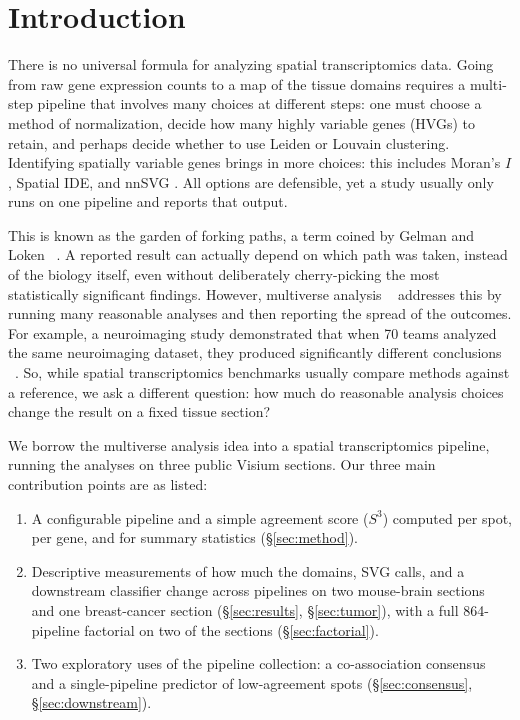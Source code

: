 \section{Introduction}
\label{sec:intro}

There is no universal formula for analyzing spatial transcriptomics data. Going from raw gene expression counts to a map of the tissue domains requires a multi-step pipeline that involves many choices at different steps: one must choose a method of normalization, decide how many highly variable genes (HVGs) to retain, and perhaps decide whether to use Leiden \cite{traag2019louvain} or Louvain \cite{blondel2008fast} clustering. Identifying spatially variable genes brings in more choices: this includes Moran's $I$, Spatial IDE, and nnSVG \cite{moran1950notes, svensson2018spatialde, weber2023nnsvg}. All options are defensible, yet a study usually only runs on one pipeline and reports that output. 

This is known as the garden of forking paths, a term coined by Gelman and Loken ~\cite{gelman2013garden}. A reported result can actually depend on which path was taken, instead of the biology itself, even without deliberately cherry-picking the most statistically significant findings. However, multiverse analysis ~\cite{steegen2016increasing} addresses
this by running many reasonable analyses and then reporting the spread of the outcomes. For example, a neuroimaging study demonstrated that when 70 teams analyzed the same neuroimaging dataset, they produced significantly different conclusions ~\cite{botvinik2020variability}. So, while spatial transcriptomics benchmarks usually compare methods against a reference, we ask a different question: how much do reasonable analysis choices change the result on a fixed tissue section? 

We borrow the multiverse analysis idea into a spatial transcriptomics pipeline, running the analyses on three public Visium sections. Our three main contribution points are as listed:

\begin{enumerate}
\item[\textbf{C1}] A configurable pipeline and a simple agreement score
  ($S^3$) computed per spot, per gene, and for summary statistics
  (\S\ref{sec:method}).
\item[\textbf{C2}] Descriptive measurements of how much the domains,
  SVG calls, and a downstream classifier change across pipelines on two
  mouse-brain sections and one breast-cancer section (\S\ref{sec:results},
  \S\ref{sec:tumor}), with a full 864-pipeline factorial on two of the
  sections (\S\ref{sec:factorial}).
\item[\textbf{C3}] Two exploratory uses of the pipeline collection: a
  co-association consensus and a single-pipeline predictor of low-agreement
  spots (\S\ref{sec:consensus}, \S\ref{sec:downstream}).
\end{enumerate}

